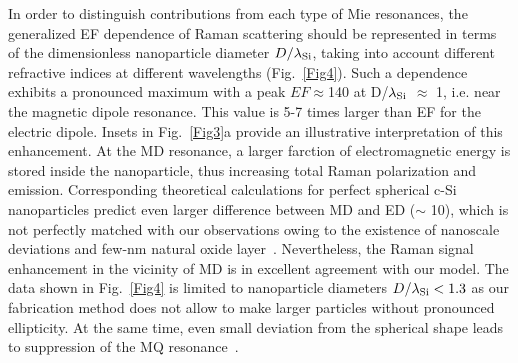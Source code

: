         In order to distinguish contributions from each type of Mie resonances, the generalized EF dependence of Raman
        scattering should be represented in terms of the dimensionless nanoparticle diameter $D/\lambda_{\rm Si}$,
        taking into account different refractive indices at different wavelengths (Fig.~\ref{Fig4}). Such a dependence
        exhibits a pronounced maximum with a peak $EF\approx$140 at D/$\lambda_{\rm Si}$ $\approx$ 1, i.e. near the
        magnetic dipole resonance. This value is 5-7 times larger than EF for the electric dipole. Insets in Fig.~\ref{Fig3}a
        provide an illustrative interpretation of this enhancement. At the MD resonance, a larger farction of electromagnetic
        energy is stored inside the nanoparticle, thus increasing total Raman polarization and emission.
        Corresponding theoretical calculations for perfect spherical c-Si nanoparticles predict even larger difference between
        MD and ED ($\sim$ 10), which is not perfectly matched with our observations owing to the existence of nanoscale
        deviations and few-nm natural oxide layer~\cite{fu2012directional, zywietz2015electromagnetic}. Nevertheless, the
        Raman signal enhancement in the vicinity of MD is in excellent agreement with our model. The data shown in Fig.~\ref{Fig4}
        is limited to nanoparticle diameters $D/\lambda_{\rm Si}<1.3$ as our fabrication method does not allow to make larger
        particles without pronounced ellipticity. At the same time, even small deviation from the spherical shape leads to
        suppression of the MQ resonance~\cite{fu2012directional}.

